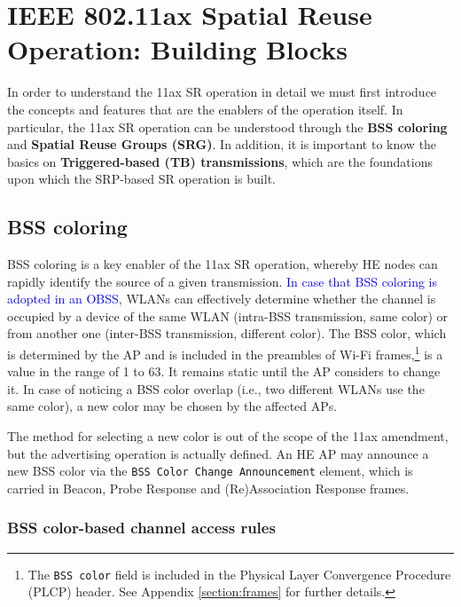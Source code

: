 \documentclass[comsoc]{IEEEtran}
\begin{document}
	\section{IEEE 802.11ax Spatial Reuse Operation: Building Blocks}
	\label{section:enablers_sr_11ax}
	In order to understand the 11ax SR operation in detail we must first introduce the concepts and features that are the enablers of the operation itself. In particular, the 11ax SR operation can be understood through the \textbf{BSS coloring} and \textbf{Spatial Reuse Groups (SRG)}. In addition, it is important to know the basics on \textbf{Triggered-based (TB) transmissions}, which are the foundations upon which the SRP-based SR operation is built.
	
	\subsection{BSS coloring}	
	\label{section:bss_coloring}	
	BSS coloring is a key enabler of the 11ax SR operation, whereby HE nodes can rapidly identify the source of a given transmission. \textcolor{blue}{In case that BSS coloring is adopted in an OBSS}, WLANs can effectively determine whether the channel is occupied by a device of the same WLAN (intra-BSS transmission, same color) or from another one (inter-BSS transmission, different color). The BSS color, which is determined by the AP and is included in the preambles of Wi-Fi frames,\footnote{The \texttt{BSS color} field is included in the Physical Layer Convergence Procedure (PLCP) header. See Appendix \ref{section:frames} for further details.} is a value in the range of 1 to 63. It remains static until the AP considers to change it. In case of noticing a BSS color overlap (i.e., two different WLANs use the same color), a new color may be chosen by the affected APs. 
	
	The method for selecting a new color is out of the scope of the 11ax amendment, but the advertising operation is actually defined. An HE AP may announce a new BSS color via the \texttt{BSS Color Change Announcement} element, which is carried in Beacon, Probe Response and (Re)Association Response frames. 
	
	\subsubsection{BSS color-based channel access rules}
	\label{section:bss_color_channel_access}
	
\end{document}
